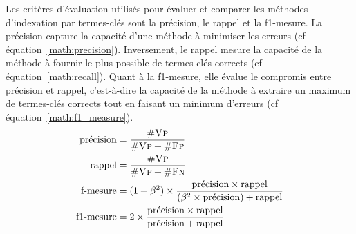     Les critères d'évaluation utilisés pour évaluer et comparer les méthodes
    d'indexation par termes-clés sont la précision, le rappel et la f1-mesure.
    La précision capture la capacité d'une méthode à minimiser les erreurs (cf
    équation~\ref{math:precision}). Inversement, le rappel mesure la capacité de
    la méthode à fournir le plus possible de termes-clés corrects (cf
    équation~\ref{math:recall}). Quant à la f1-mesure, elle évalue le compromis
    entre précision et rappel, c'est-à-dire la capacité de la méthode à extraire
    un maximum de termes-clés corrects tout en faisant un minimum d'erreurs (cf
    équation~\ref{math:f1_measure}).
    \begin{align}
      \text{précision} &= \frac{\#\textsc{Vp}}{\#\textsc{Vp} + \#\textsc{Fp}} \label{math:precision}\\
      \text{rappel} &= \frac{\#\textsc{Vp}}{\#\textsc{Vp} + \#\textsc{Fn}} \label{math:recall}\\
      \text{f-mesure} &= (1 + \beta^2) \times \frac{\text{précision} \times \text{rappel}}{(\beta^2 \times \text{précision}) + \text{rappel}} \label{math:f_measure}\\
      \text{f1-mesure} &= 2 \times \frac{\text{précision} \times \text{rappel}}{\text{précision} + \text{rappel}} \label{math:f1_measure}
    \end{align}
      

